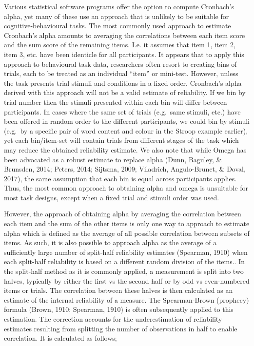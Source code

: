 \documentclass[english,,man,floatsintext]{apa6}
\begin{document}
Various statistical software programs offer the option to compute Cronbach's alpha, yet many of these use an approach that is unlikely to be suitable for cognitive-behavioural tasks. The most commonly used approach to estimate Cronbach's alpha amounts to averaging the correlations between each item score and the sum score of the remaining items. I.e. it assumes that item 1, item 2, item 3, etc. have been identicle for all participants. It appears that to apply this approach to behavioural task data, researchers often resort to creating bins of trials, each to be treated as an individual \enquote{item} or mini-test. However, unless the task presents trial stimuli and conditions in a fixed order, Cronbach's alpha derived with this approach will not be a valid estimate of reliability. If we bin by trial number then the stimuli presented within each bin will differ between participants. In cases where the same set of trials (e.g.~same stimuli, etc.) have been offered in random order to the different participants, we could bin by stimuli (e.g.~by a specific pair of word content and colour in the Stroop example earlier), yet each bin/item-set will contain trials from different stages of the task which may reduce the obtained reliability estimate. We also note that while Omega has been advocated as a robust estimate to replace alpha (Dunn, Baguley, \& Brunsden, 2014; Peters, 2014; Sijtsma, 2009; Viladrich, Angulo-Brunet, \& Doval, 2017), the same assumption that each bin is equal across participants applies. Thus, the most common approach to obtaining alpha and omega is unsuitable for most task designs, except when a fixed trial and stimuli order was used.

However, the approach of obtaining alpha by averaging the correlation between each item and the sum of the other items is only one way to approach to estimate alpha which is defined as the average of all possible correlation between subsets of items. As such, it is also possible to approach alpha as the average of a sufficiently large number of split-half reliability estimates (Spearman, 1910) when each split-half reliability is based on a different random division of the items.. In the split-half method as it is commonly applied, a measurement is split into two halves, typically by either the first vs the second half or by odd vs even-numbered items or trials. The correlation between these halves is then calculated as an estimate of the internal reliability of a measure. The Spearman-Brown (prophecy) formula (Brown, 1910; Spearman, 1910) is often subsequently applied to this estimation. The correction accounts for the underestimation of reliability estimates resulting from splitting the number of observations in half to enable correlation. It is calculated as follows;
\end{document}
